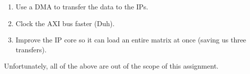 \documentclass[../main.tex]{subfiles}
\begin{document}
\begin{enumerate}
    \item Use a DMA to transfer the data to the IPs.
    \item Clock the AXI bus faster (Duh).
    \item Improve the IP core so it can load an entire matrix at once (saving us three transfers).
\end{enumerate}

Unfortunately, all of the above are out of the scope of this assignment.
\end{document}
